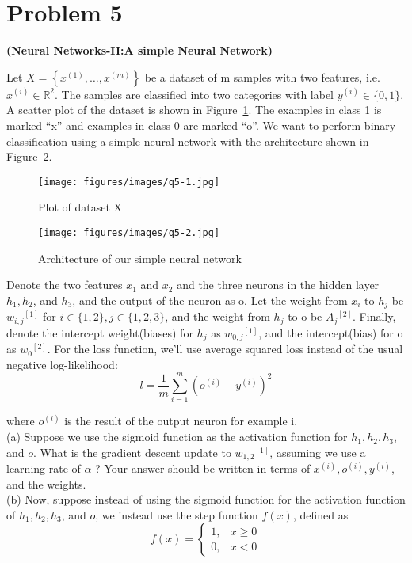 \section*{Problem 5}

\textbf{(Neural Networks-II:\@ A simple Neural Network)}

Let \( X=\left\{x^{(1)}, \ldots, x^{(m)}\right\} \) be a dataset of m samples with two features, i.e. \( x^{(i)} \in \mathbb{R}^{2} \).
The samples are classified into two categories with label \( y^{(i)} \in\{0,1\} \).
A scatter plot of the dataset is shown in Figure~\ref{fig:q5-1}.
The examples in class 1 is marked ``x'' and examples in class 0 are marked ``o''.
We want to perform binary classification using a simple neural network with the architecture shown in Figure~\ref{fig:q5-2}.

\begin{figure}[htb]
    \centering
    \texttt{[image: figures/images/q5-1.jpg]}
    \caption{
        Plot of dataset X
    }\label{fig:q5-1}
\end{figure}

\begin{figure}[htb]
    \centering
    \texttt{[image: figures/images/q5-2.jpg]}
    \caption{
        Architecture of our simple neural network
    }\label{fig:q5-2}
\end{figure}

Denote the two features \( x_{1} \) and \( x_{2} \) and the three neurons in the hidden layer \( h_{1}, h_{2} \), and \( h_{3} \), and the output of the neuron as o. Let the weight from \( x_{i} \) to \( h_{j} \) be \( w_{i, j}{ }^{[1]} \) for \( i \in\{1,2\}, j \in\{1,2,3\} \), and the weight from \( h_{j} \) to o be \( A_{j}{ }^{[2]} \). Finally, denote the intercept weight(biases) for \( h_{j} \) as \( w_{0, j}{ }^{[1]} \), and the intercept(bias) for o as \( w_{0}{ }^{[2]} \). For the loss function, we'll use average squared loss instead of the usual negative log-likelihood:
\[
    l=\frac{1}{m} \sum_{i=1}^{m}\left(o^{(i)}-y^{(i)}\right)^{2}
\]

where \( o^{(i)} \) is the result of the output neuron for example i.\\
(a) Suppose we use the sigmoid function as the activation function for \( h_{1}, h_{2}, h_{3} \), and \( o \). What is the gradient descent update to \( w_{1,2}{ }^{[1]} \), assuming we use a learning rate of \( \alpha \) ? Your answer should be written in terms of \( x^{(i)}, o^{(i)}, y^{(i)} \), and the weights.\\
(b) Now, suppose instead of using the sigmoid function for the activation function of \( h_{1}, h_{2}, h_{3} \), and \( o \), we instead use the step function \( f(x) \), defined as
\[
    f(x)= \begin{cases}1, & x \geq 0 \\ 0, & x<0\end{cases}
\]

